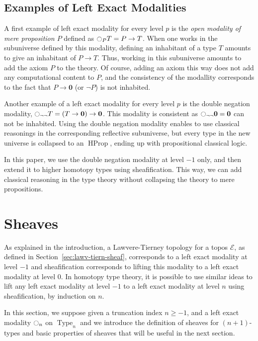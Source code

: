 \documentclass[conference]{IEEEtran}
\DeclareMathOperator{\Type}{Type}
\DeclareMathOperator{\HProp}{HProp}
\newcommand{\modal}{\ensuremath{\ocircle}}
\newcommand \E {\mathcal{E}}
\newcommand \zero {\mathbf{0}}
\begin{document}
\subsection{Examples of Left Exact Modalities}
\label{sec:examples-left-exact}

A first example of left exact modality for every level $p$ is the {\em
  open modality of mere proposition $P$} defined as
$\modal_P T = P \to T$.
%
When one works in
the subuniverse defined by this modality, defining an inhabitant of a
type $T$ amounts to give an inhabitant of $P \to T$. 
%
Thus, working in this subuniverse amounts to add the axiom $P$ to the
theory. Of course, adding an axiom this way does not add any computational
content to $P$, and the consistency of the modallity corresponds to
the fact that $P \to \zero$ (or $\lnot P$) is not inhabited.

Another example of a left exact modality for every level $p$ is the
double negation modality,
$\modal_{\lnot\lnot} T = (T \to \zero) \to \zero$.
%
This modality is consistent as $\modal_{\lnot\lnot} \zero = \zero$ can
not be inhabited.
%
Using the double negation modality enables to use classical reasonings
in the corresponding reflective subuniverse, but every type in the new
universe is collapsed to an $\HProp$, ending up with propositional
classical logic.

In this paper, we use the double negation modality at level $-1$ only,
and then extend it to higher homotopy types using sheafification. This
way, we can add classical reasoning in the type theory without
collapsing the theory to mere propositions.




\section{Sheaves}
\label{sec:sheaves}

As explained in the introduction, a Lawvere-Tierney topology for a
topos $\E$, as defined in Section~\ref{sec:lawv-tiern-sheaf},
corresponds to a left exact modality at level $-1$
%
and sheafification corresponds to lifting this modality to a left
exact modality at level $0$.
%
In homotopy type theory, it is possible to use similar ideas to lift
any left exact modality at level $-1$ to a left exact modality at level
$n$ using sheafification, by induction on $n$.

In this section, we suppose given a truncation index $n\geqslant -1$,
and a left exact modality $\modal_n$ on $\Type_n$ and we introduce the
definition of sheaves for $(n+1)$-types and basic properties of
sheaves that will be useful in the next section. 
\end{document}
